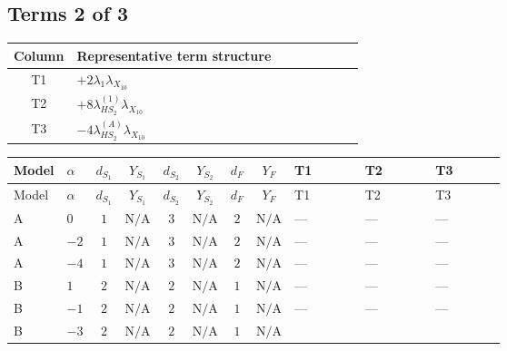 \documentclass[8pt]{article}
\begin{document}
\begin{landscape}
\subsection*{Terms 2 of 3}
\begin{center}
\begin{tabular}{@{}c >{\raggedright\arraybackslash}p{0.82\linewidth}@{}}
\toprule
Column & Representative term structure \\
\midrule
T1 & \(\displaystyle +2 {\lambda_1} {\lambda_{X_{10}}}\) \\
\midrule
T2 & \(\displaystyle +8 {\lambda_{HS_2}^{(1)}} {\lambda_{X_{10}}}\) \\
\midrule
T3 & \(\displaystyle -4 {\lambda_{HS_2}^{(A)}} {\lambda_{X_{10}}}\) \\
\midrule
\bottomrule
\end{tabular}
\end{center}
\smallskip
\tiny
\begin{longtable}{@{}llcccccc >{\raggedright\arraybackslash}p{0.21\linewidth} >{\raggedright\arraybackslash}p{0.21\linewidth} >{\raggedright\arraybackslash}p{0.21\linewidth}@{}}
\toprule
Model & $\alpha$ & $d_{S_1}$ & $Y_{S_1}$ & $d_{S_2}$ & $Y_{S_2}$ & $d_F$ & $Y_F$ & T1 & T2 & T3 \\
\midrule
\endfirsthead
\toprule
Model & $\alpha$ & $d_{S_1}$ & $Y_{S_1}$ & $d_{S_2}$ & $Y_{S_2}$ & $d_F$ & $Y_F$ & T1 & T2 & T3 \\
\midrule
\endhead
A & $0$ & $1$ & $\text{N/A}$ & $3$ & $\text{N/A}$ & $2$ & $\text{N/A}$ & --- & --- & --- \\
\midrule
A & $-2$ & $1$ & $\text{N/A}$ & $3$ & $\text{N/A}$ & $2$ & $\text{N/A}$ & --- & --- & --- \\
\midrule
A & $-4$ & $1$ & $\text{N/A}$ & $3$ & $\text{N/A}$ & $2$ & $\text{N/A}$ & --- & --- & --- \\
\midrule
B & $1$ & $2$ & $\text{N/A}$ & $2$ & $\text{N/A}$ & $1$ & $\text{N/A}$ & --- & --- & --- \\
\midrule
B & $-1$ & $2$ & $\text{N/A}$ & $2$ & $\text{N/A}$ & $1$ & $\text{N/A}$ & --- & --- & --- \\
\midrule
B & $-3$ & $2$ & $\text{N/A}$ & $2$ & $\text{N/A}$ & $1$ & $\text{N/A}$ & \scriptsize\adjustbox{max width=\linewidth}{$\begin{gathered} +2 {\lambda_1} {\lambda_{X_{10}}}\end{gathered}$} & \scriptsize\adjustbox{max width=\linewidth}{$\begin{gathered} +8 {\lambda_{HS_2}^{(1)}} {\lambda_{X_{10}}}\end{gathered}$} & \scriptsize\adjustbox{max width=\linewidth}{$\begin{gathered} -4 {\lambda_{HS_2}^{(A)}} {\lambda_{X_{10}}}\end{gathered}$} \\

\end{longtable}
\end{landscape}
\end{document}
